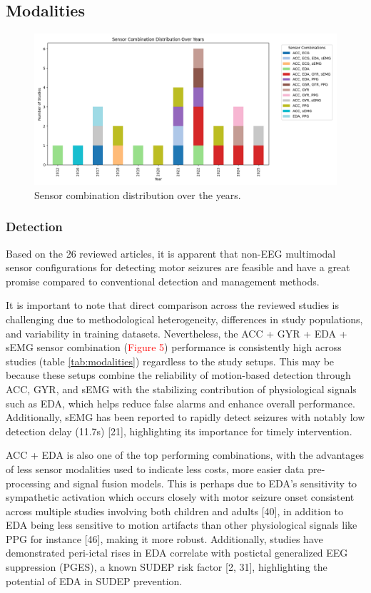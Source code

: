 \subsection{Modalities}

\begin{figure}
    \centering
    \includegraphics[width=1\textwidth]{Discussion/figures/Sensor_Combination_Distribution_Over_the_Years.png}
    \caption{Sensor combination distribution over the years.}
    \label{fig:sensor_comb_over_years}
\end{figure}

\subsubsection{Detection}
Based on the 26 reviewed articles, it is apparent that non-EEG multimodal sensor configurations for detecting motor seizures are feasible and have a great promise compared to conventional detection and management methods. 

It is important to note that direct comparison across the reviewed studies is challenging due to methodological heterogeneity, differences in study populations, and variability in training datasets. Nevertheless, the ACC + GYR + EDA + sEMG sensor combination (\textcolor{red}{Figure 5}) performance is consistently high across studies (table \ref{tab:modalities}) regardless to the study setups. This may be because these setups combine the reliability of motion-based detection through ACC, GYR, and sEMG with the stabilizing contribution of physiological signals such as EDA, which helps reduce false alarms and enhance overall performance. Additionally, sEMG has been reported to rapidly detect seizures with notably low detection delay (11.7s) [21], highlighting its importance for timely intervention.

ACC + EDA is also one of the top performing combinations, with the advantages of less sensor modalities used to indicate less costs, more easier data pre-processing and signal fusion models. This is perhaps due to EDA’s sensitivity to sympathetic activation which occurs closely with motor seizure onset consistent across multiple studies involving both children and adults [40], in addition to EDA being less sensitive to motion artifacts than other physiological signals like PPG for instance [46], making it more robust. Additionally, studies have demonstrated peri-ictal rises in EDA correlate with postictal generalized EEG suppression (PGES), a known SUDEP risk factor [2, 31], highlighting the potential of EDA in SUDEP prevention.

